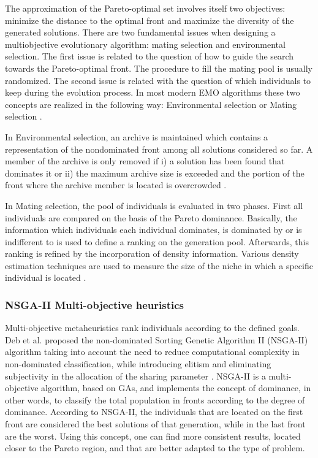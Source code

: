 \documentclass{report}
\begin{document}
The approximation of the Pareto-optimal set involves itself two objectives: minimize the distance to the optimal front and maximize the diversity of the generated solutions. There are two fundamental issues when designing a multiobjective evolutionary algorithm: mating selection and environmental selection. The first issue is related to the question of how to guide the search towards the Pareto-optimal front. The procedure to fill the mating pool is usually randomized. The second issue is related with the question of which individuals to keep during the evolution process. In most modern EMO algorithms these two concepts are realized in the following way: Environmental selection or Mating selection \cite{Zitzler2001}.

In  Environmental selection, an archive is maintained which contains a representation of the nondominated front among all solutions considered so far. A member of the archive is only removed if i) a solution has been found that dominates it or ii) the maximum archive size is exceeded and the portion of the front where the archive member is located is overcrowded \cite{Zitzler2001}.

In Mating selection, the pool of individuals is evaluated in two phases. First all individuals are compared on the basis of the Pareto dominance. Basically, the information which individuals each individual dominates, is dominated by or is indifferent to is used to define a ranking on the generation pool. Afterwards, this ranking is refined by the incorporation of density information. Various density estimation techniques are used to measure the size of the niche in which a specific individual is located \cite{Zitzler2001}.


\subsubsection{NSGA-II Multi-objective heuristics}


Multi-objective metaheuristics rank individuals according to the defined goals. Deb et al.  proposed the non-dominated Sorting Genetic Algorithm II (NSGA-II) algorithm taking into account the need to reduce computational complexity in non-dominated classification, while introducing elitism and eliminating subjectivity in the allocation of the sharing parameter \cite{Deb2000}. NSGA-II is a multi-objective algorithm, based on GAs, and implements the concept of dominance, in other words, to classify the total population in fronts according to the degree of dominance. According to NSGA-II, the individuals that are located on the first front are considered the best solutions of that generation, while in the last front are the worst. Using this concept, one can find more consistent results, located closer to the Pareto region, and that are better adapted to the type of problem.
\end{document}
